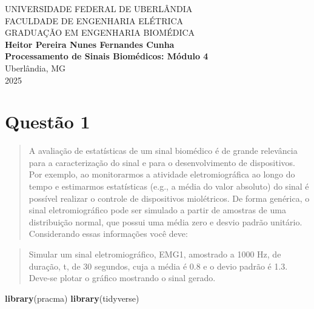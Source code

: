\documentclass[
]{article}
\author{}
\date{\vspace{-2.5em}}
\newenvironment{Shaded}{\begin{snugshade}}{\end{snugshade}}
\newcommand{\FunctionTok}[1]{\textcolor[rgb]{0.13,0.29,0.53}{\textbf{#1}}}
\newcommand{\NormalTok}[1]{#1}
\begin{document}
\newpage
\begin{titlepage}
\begin{center}

\large
UNIVERSIDADE FEDERAL DE UBERLÂNDIA\\
FACULDADE DE ENGENHARIA ELÉTRICA\\
GRADUAÇÃO EM ENGENHARIA BIOMÉDICA\\[7cm]

\Large
\textbf{Heitor Pereira Nunes Fernandes Cunha}\\[2cm]

\textbf{\large Processamento de Sinais Biomédicos: Módulo 4}\\[10cm]

\large
Uberlândia, MG\\
2025

\end{center}
\end{titlepage}

\newpage
\section*{Questão 1}

\begin{quote}
A avaliação de estatísticas de um sinal biomédico é de grande relevância
para a caracterização do sinal e para o desenvolvimento de dispositivos.
Por exemplo, ao monitorarmos a atividade eletromiográfica ao longo do
tempo e estimarmos estatísticas (e.g., a média do valor absoluto) do
sinal é possível realizar o controle de dispositivos miolétricos. De
forma genérica, o sinal eletromiográfico pode ser simulado a partir de
amostras de uma distribuição normal, que possui uma média zero e desvio
padrão unitário. Considerando essas informações você deve:
\end{quote}

\begin{quote}
Simular um sinal eletromiográfico, EMG1, amostrado a 1000 Hz, de
duração, t, de 30 segundos, cuja a média é 0.8 e o devio padrão é 1.3.
Deve-se plotar o gráfico mostrando o sinal gerado.
\end{quote}

\begin{Shaded}
\begin{Highlighting}[]
\FunctionTok{library}\NormalTok{(pracma)}
\FunctionTok{library}\NormalTok{(tidyverse)}
\end{Highlighting}
\end{Shaded}
\end{document}
